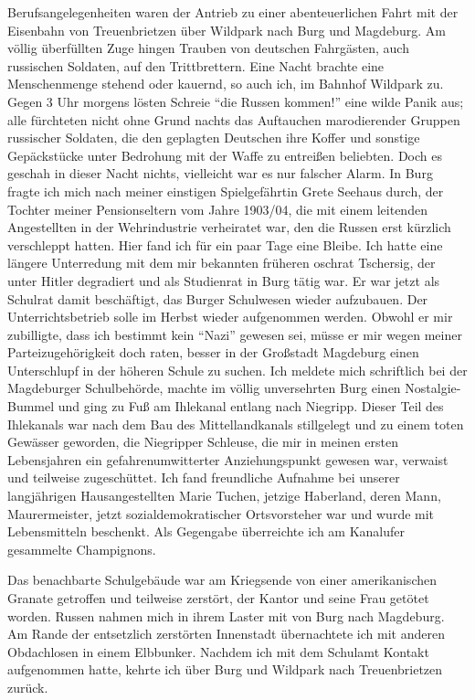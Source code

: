 \documentclass[a5paper,pagesize,10pt,twoside=true]{scrbook}
\renewcommand{\marginpar}[2][]{}
\begin{document}
Berufsangelegenheiten waren der Antrieb zu einer abenteuerlichen Fahrt mit der Eisenbahn von Treuenbrietzen über Wildpark nach Burg und Magdeburg. Am völlig überfüllten Zuge hingen Trauben von deutschen Fahrgästen, auch russischen Soldaten, auf den Trittbrettern. Eine Nacht brachte eine Menschenmenge stehend oder kauernd, so auch ich, im Bahnhof Wildpark zu. Gegen 3 Uhr morgens lösten Schreie \enquote{die Russen kommen!} eine wilde Panik aus; alle fürchteten nicht ohne Grund nachts das Auftauchen marodierender Gruppen russischer Soldaten, die den geplagten Deutschen ihre Koffer und sonstige Gepäckstücke unter \marginpar{106} Bedrohung mit der Waffe zu entreißen beliebten. Doch es geschah in dieser Nacht nichts, vielleicht war es nur falscher Alarm. In Burg fragte ich mich nach meiner einstigen Spielgefährtin Grete Seehaus durch, der Tochter meiner Pensionseltern vom Jahre 1903/04, die mit einem leitenden Angestellten in der Wehrindustrie verheiratet war, den die Russen erst kürzlich verschleppt hatten. Hier fand ich für ein paar Tage eine Bleibe. Ich hatte eine längere Unterredung mit dem mir bekannten früheren \ac{oschrat} Tschersig, der unter Hitler degradiert und als Studienrat in Burg tätig war. Er war jetzt als Schulrat damit beschäftigt, das Burger Schulwesen wieder aufzubauen. Der Unterrichtsbetrieb solle im Herbst wieder aufgenommen werden. Obwohl er mir zubilligte, dass ich bestimmt kein \enquote{Nazi} gewesen sei, müsse er mir wegen meiner Parteizugehörigkeit doch raten, besser in der Großstadt Magdeburg einen Unterschlupf in der höheren Schule zu suchen. Ich meldete mich schriftlich bei der Magdeburger Schulbehörde, machte im völlig unversehrten Burg einen Nostalgie-Bummel und ging zu Fuß am Ihlekanal entlang nach Niegripp. Dieser Teil des Ihlekanals war nach dem Bau des Mittellandkanals \marginpar{107} stillgelegt und zu einem toten Gewässer geworden, die Niegripper Schleuse, die mir in meinen ersten Lebensjahren ein gefahrenumwitterter Anziehungspunkt gewesen war, verwaist und teilweise zugeschüttet. Ich fand freundliche Aufnahme bei unserer langjährigen Hausangestellten Marie Tuchen, jetzige Haberland, deren Mann, Maurermeister, jetzt sozialdemokratischer Ortsvorsteher war und wurde mit Lebensmitteln beschenkt. Als Gegengabe überreichte ich am Kanalufer gesammelte Champignons.

Das benachbarte Schulgebäude war am Kriegsende von einer amerikanischen Granate getroffen und teilweise zerstört, der Kantor und seine Frau getötet worden. Russen nahmen mich in ihrem Laster mit von Burg nach Magdeburg. Am Rande der entsetzlich zerstörten Innenstadt übernachtete ich mit anderen Obdachlosen in einem Elbbunker. Nachdem ich mit dem Schulamt Kontakt aufgenommen hatte, kehrte ich über Burg und Wildpark nach Treuenbrietzen zurück.
\end{document}
